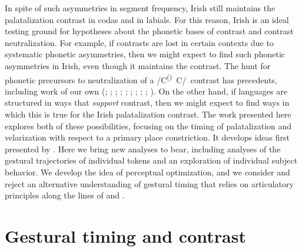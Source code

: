 \documentclass[output=paper,colorlinks,citecolor=brown]{langscibook}
\newcommand{\pal}{\ipa{ʲ}}
\newcommand{\vel}{\ipa{ˠ}}
\newcommand{\velop}{\textsuperscript{(}\vel\textsuperscript{)}}
\newcommand{\palcongen}{/C\velop\ C\pal/}
\begin{document}
In spite of such asymmetries in segment frequency, Irish still maintains the palatalization contrast in codas and in labials. For this reason, Irish is an ideal testing ground for hypotheses about the phonetic bases of contrast and contrast neutralization. For example, if contrasts are lost in certain contexts due to systematic phonetic asymmetries, then we might expect to find such phonetic asymmetries in Irish, even though it maintains the contrast. The hunt for phonetic precursors to neutralization of a \palcongen\ contrast has precedents, including work of our own (\cite{Kochetov2002_diss}; \citeyear{Kochetov:2005}; \citeyear{Kochetov2006_syll_poss}; \cite{NiChiosain_Padgett2012_Irish_pal_acous_percep}; \cite{Stoll:2017}; \cite{Padgett_NiChiosain2018_Russian_Irish_pal_percep}; \cite{Iskarous_Kavitskaya2018_Slavic_palatalization}; \cite{Kirkham_Nance2022_diachronic_contrast_Gaelic_pal_son}; \cite{Padgett_etal2023_Irish_pal_syllpos}; \cite{Bennett_etal2023_jphon_submission}). On the other hand, if languages are structured in ways that \emph{support} contrast, then we might expect to find ways in which this is true for the Irish palatalization contrast. The work presented here explores both of these possibilities, focusing on the timing of palatalization and velarization with respect to a primary place constriction. It develops ideas first presented by \citet{Padgett_etal2023_Irish_pal_syllpos}. Here we bring new analyses to bear, including analyses of the gestural trajectories of individual tokens and an exploration of individual subject behavior. We develop the idea of perceptual optimization, and we consider and reject an alternative understanding of gestural timing that relies on articulatory principles along the lines of \citet{Sproat_Fujimura1993_l-allophony} and \citet{Krakow1999_physiological_syllables}.


\section{Gestural timing and contrast}
\end{document}
